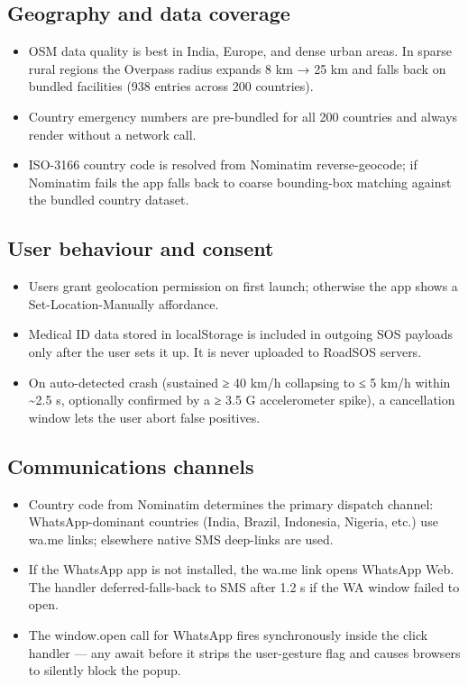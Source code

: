 \documentclass[11pt, a4paper]{article}
\begin{document}
\subsection{Geography and data coverage}
\begin{itemize}
  \item OSM data quality is best in India, Europe, and dense urban areas. In sparse rural regions the Overpass radius expands 8 km → 25 km and falls back on bundled facilities (938 entries across 200 countries).
  \item Country emergency numbers are pre-bundled for all 200 countries and always render without a network call.
  \item ISO-3166 country code is resolved from Nominatim reverse-geocode; if Nominatim fails the app falls back to coarse bounding-box matching against the bundled country dataset.
\end{itemize}

\subsection{User behaviour and consent}
\begin{itemize}
  \item Users grant geolocation permission on first launch; otherwise the app shows a Set-Location-Manually affordance.
  \item Medical ID data stored in localStorage is included in outgoing SOS payloads only after the user sets it up. It is never uploaded to RoadSOS servers.
  \item On auto-detected crash (sustained ≥ 40 km/h collapsing to ≤ 5 km/h within \textasciitilde{}2.5 s, optionally confirmed by a ≥ 3.5 G accelerometer spike), a cancellation window lets the user abort false positives.
\end{itemize}

\subsection{Communications channels}
\begin{itemize}
  \item Country code from Nominatim determines the primary dispatch channel: WhatsApp-dominant countries (India, Brazil, Indonesia, Nigeria, etc.) use wa.me links; elsewhere native SMS deep-links are used.
  \item If the WhatsApp app is not installed, the wa.me link opens WhatsApp Web. The handler deferred-falls-back to SMS after 1.2 s if the WA window failed to open.
  \item The window.open call for WhatsApp fires synchronously inside the click handler — any await before it strips the user-gesture flag and causes browsers to silently block the popup.
\end{itemize}
\end{document}
